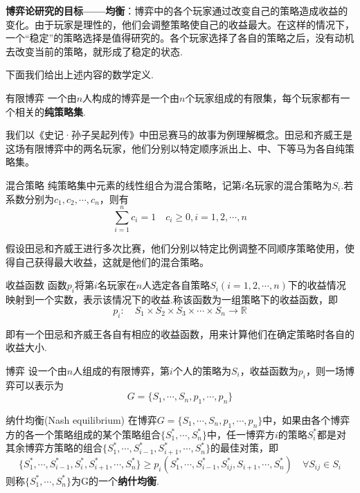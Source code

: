 \documentclass[11pt,a4paper]{article}
\theoremstyle{definition}
\begin{document}
	\textbf{博弈论研究的目标——均衡}：博弈中的各个玩家通过改变自己的策略造成收益的变化。由于玩家是理性的，他们会调整策略使自己的收益最大。在这样的情况下，一个“稳定”的策略选择是值得研究的。各个玩家选择了各自的策略之后，没有动机去改变当前的策略，就形成了稳定的状态.
	
	下面我们给出上述内容的数学定义.
	\begin{defn}{有限博弈}{}
		一个由$n$人构成的博弈是一个由$n$个玩家组成的有限集，每个玩家都有一个相关的\textbf{纯策略集}.
	\end{defn}
	
	我们以《史记·孙子吴起列传》中田忌赛马的故事为例理解概念。田忌和齐威王是这场有限博弈中的两名玩家，他们分别以特定顺序派出上、中、下等马为各自纯策略集。
	
	\begin{defn}{混合策略}{}
		 纯策略集中元素的线性组合为混合策略，记第$i$名玩家的混合策略为$S_{i}$.若系数分别为$c_{1},c_{2},\cdots,c_{n}$，则有\[ \sum_{i=1}^{n}c_{i}=1\quad c_{i}\geq0,i=1,2,\cdots,n \]
	\end{defn}
	
	假设田忌和齐威王进行多次比赛，他们分别以特定比例调整不同顺序策略使用，使得自己获得最大收益，这就是他们的混合策略。
	\begin{defn}{收益函数}{}
		函数$p_{i}$将第$i$名玩家在$n$人选定各自策略$S_{i}(i=1,2,\cdots,n)$下的收益情况映射到一个实数，表示该情况下的收益.称该函数为一组策略下的收益函数，即\[ p_{i}:\quad S_{1}\times S_{2}\times S_{3}\times \cdots \times S_{n}\rightarrow \mathbb{R} \]
	\end{defn}
	即有一个田忌和齐威王各自有相应的收益函数，用来计算他们在确定策略时各自的收益大小.
	\begin{defn}{博弈}
		设一个由$n$人组成的有限博弈，第$i$个人的策略为$S_{i}$，收益函数为$p_{i}$，则一场博弈可以表示为\[ G=\{S_{1},\cdots,S_{n},p_{1},\cdots,p_{n}\} \]
	\end{defn}
	
	\begin{defn}{纳什均衡(Nash equilibrium)}{}
		在博弈$G=\{S_{1},\cdots,S_{n},p_{1},\cdots,p_{n}\}$中，如果由各个博弈方的各一个策略组成的某个策略组合$\{S_{1}^{*},\cdots,S_{n}^{*}\}$中，任一博弈方$i$的策略$S_{i}^{*}$都是对其余博弈方策略的组合$\{S_{1}^{*},\cdots,S_{i-1}^{*},S_{i+1}^{*},\cdots,S_{n}^{*}\}$的最佳对策，即\[ \{S_{1}^{*},\cdots,S_{i-1}^{*},S_{i}^{*},S_{i+1}^{*},\cdots,S_{n}^{*}\}\geq p_{i}(S_{1}^{*},\cdots,S_{i-1}^{*},S_{ij}^{*},S_{i+1},\cdots,S_{n}^{*})\quad\forall S_{ij}\in S_{i} \]则称$\{S_{1}^{*},\cdots,S_{n}^{*}\}$为G的一个\textbf{纳什均衡}.
	\end{defn}
	
\end{document}
